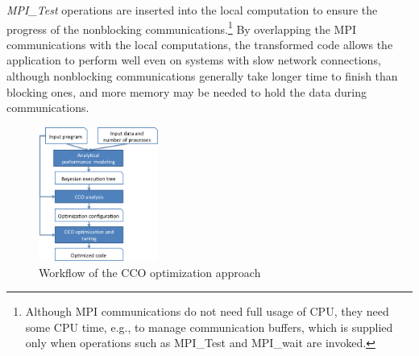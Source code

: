 \emph{MPI\_Test} operations are inserted into the local computation to
ensure the progress of the nonblocking
communications.\footnote{Although MPI communications do not need full
  usage of CPU, they need some CPU time, e.g., to manage communication
  buffers, which is supplied only when operations such as MPI\_Test
  and MPI\_wait are invoked.}  By overlapping the MPI communications
with the local computations, the transformed code allows the
application to perform well even on systems with slow network
connections, although nonblocking communications generally take longer
time to finish than blocking ones, and more memory may be needed to
hold the data during communications.

\begin{figure}[h]
\centering
\includegraphics[width=0.35\textwidth]{fig/framework.png} %
\caption{Workflow of the CCO optimization approach}
\label{fig:overview}
\end{figure}

